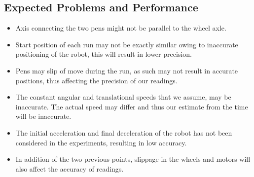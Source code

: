 \documentclass[10pt,a4paper]{article}
\begin{document}
	\subsection{Expected Problems and Performance}
		\begin{itemize}
			\item Axis connecting the two pens might not be parallel to the wheel axle.	
			\item Start position of each run may not be exactly similar owing to inaccurate positioning of the robot, this will result in lower precision.
			\item Pens may slip of move during the run, as such may not result in accurate positions, thus affecting the precision of our readings.
			\item The constant angular and translational speeds that we assume, may be inaccurate. The actual speed may differ and thus our estimate from the time will be inaccurate.
			\item The initial acceleration and final deceleration of the robot has not been considered in the experiments, resulting in low accuracy.					
			\item In addition of the two previous points, slippage in the wheels and motors will also affect the accuracy of readings.
		\end{itemize}

	
\end{document}

